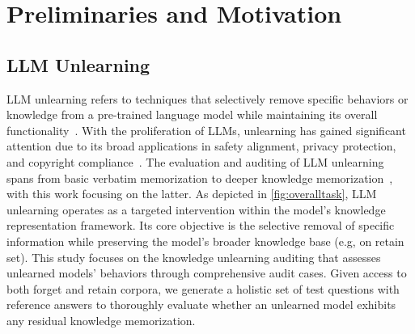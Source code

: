 \section{Preliminaries and Motivation}
\label{sec:prelim}



\subsection{LLM Unlearning}

LLM unlearning refers to techniques that selectively remove specific behaviors or knowledge from a pre-trained language model while maintaining its overall functionality~\cite{yao2023large}. 
With the proliferation of LLMs, unlearning has gained significant attention due to its broad applications in safety alignment, privacy protection, and copyright compliance~\cite{eldan2023s,liu2024rethinking,jia-etal-2024-soul}. The evaluation and auditing of LLM unlearning spans from basic verbatim memorization to deeper knowledge memorization~\cite{shi2024muse}, with this work focusing on the latter.
As depicted in \autoref{fig:overalltask}, LLM unlearning operates as a targeted intervention within the model's knowledge representation framework. 
Its core objective is the selective removal of specific information while preserving the model's broader knowledge base (e.g, on retain set). 
This study focuses on the knowledge unlearning auditing that assesses unlearned models' behaviors through comprehensive audit cases. Given access to both forget and retain corpora, we generate a holistic set of test questions with reference answers to thoroughly evaluate whether an unlearned model exhibits any residual knowledge memorization.



